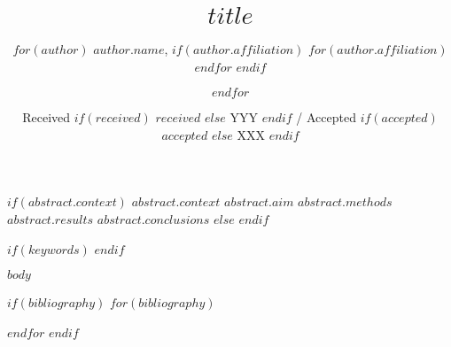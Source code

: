 \documentclass{aa}
\begin{document}
\title{$title$}

\author{
$for(author)$
$author.name$,
$if(author.affiliation)$
$for(author.affiliation)$
$endfor$
$endif$
\and
$endfor$
}


\date{
Received
$if(received)$
$received$
$else$
YYY
$endif$
/ 
Accepted 
$if(accepted)$
$accepted$
$else$
XXX
$endif$
}

$if(abstract.context)$
\abstract
{$abstract.context$}
{$abstract.aim$}
{$abstract.methods$}
{$abstract.results$}
{$abstract.conclusions$}
$else$
$endif$

$if(keywords)$
$endif$

\maketitle

$body$

$if(bibliography)$
$for(bibliography)$

$endfor$
$endif$
\end{document}
